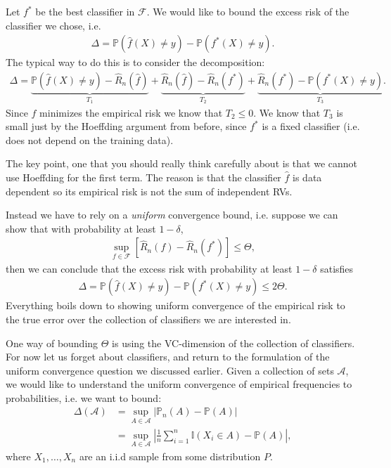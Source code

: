 \documentclass[twoside,12pt]{article}
\begin{document}
Let $f^*$ be the best classifier in $\mathcal{F}$. 
We would like to bound the excess risk of the classifier we chose, i.e.
\begin{align*}
\Delta = \mathbb{P}(\widehat{f}(X) \neq y) - \mathbb{P}(f^*(X) \neq y).
\end{align*}
The typical way to do this is to consider the decomposition:
\begin{align*}
\Delta = \underbrace{\mathbb{P}(\widehat{f}(X) \neq y) - \widehat{R}_n(\widehat{f}) }_{T_1}
+\underbrace{ \widehat{R}_n(\widehat{f}) - \widehat{R}_n(f^*)}_{T_2} +  \underbrace{\widehat{R}_n(f^*)-\mathbb{P}(f^*(X) \neq y)}_{T_3}.
\end{align*}
Since $\widehat{f}$ minimizes the empirical risk we know that $T_2 \leq 0$. We know that $T_3$ is small just by the Hoeffding argument from before, since $f^*$ is a fixed classifier (i.e. does not depend on the training data). 

The key point, one that you should really think carefully about is that we cannot use Hoeffding for the first term. The reason is that the classifier $\widehat{f}$ is data dependent so its empirical risk is not the sum of independent RVs.

Instead we have to rely on a \emph{uniform} convergence bound, i.e. suppose we can show that with probability at least $1 - \delta$,
\begin{align*}
\sup_{f \in \mathcal{F}} \left[ \widehat{R}_n(f) - \widehat{R}_n(f^*) \right]\leq \Theta,
\end{align*}
then we can conclude that the excess risk with probability at least $1 - \delta$ satisfies 
\begin{align*}
\Delta = \mathbb{P}(\widehat{f}(X) \neq y) - \mathbb{P}(f^*(X) \neq y) \leq 2 \Theta.
\end{align*}
Everything boils down to showing uniform convergence of the empirical risk to the true error over the collection of classifiers we are interested in.

One way of bounding $\Theta$ is using the VC-dimension of the collection of classifiers. For now let us forget about classifiers, and return to the formulation of the uniform convergence question we discussed earlier. Given a collection of sets $\mathcal{A}$, we would like to understand the uniform convergence of empirical frequencies to probabilities, i.e. we want to bound:
\begin{align*}
\Delta(\mathcal{A}) &= \sup_{A \in \mathcal{A}} |\mathbb{P}_n(A) - \mathbb{P}(A)| \\
&=\sup_{A \in \mathcal{A}} \left| \frac{1}{n} \sum_{i=1}^n \mathbb{I}(X_i \in A) - \mathbb{P}(A) \right|,
\end{align*}
where $X_1,\ldots, X_n$ are an i.i.d sample from some distribution $P$.
\end{document}
